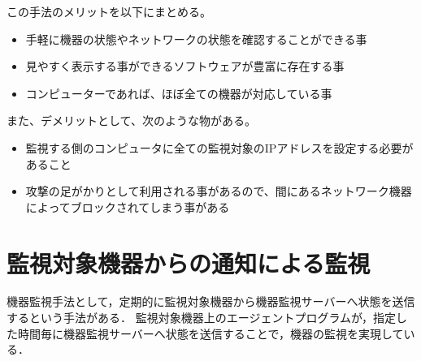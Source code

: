 	この手法のメリットを以下にまとめる。
	\begin{itemize}
		\item 手軽に機器の状態やネットワークの状態を確認することができる事
		\item 見やすく表示する事ができるソフトウェアが豊富に存在する事
		\item コンピューターであれば、ほぼ全ての機器が対応している事
	\end{itemize}

	また、デメリットとして、次のような物がある。
	\begin{itemize}
		\item 監視する側のコンピュータに全ての監視対象のIPアドレスを設定する必要があること
		\item 攻撃の足がかりとして利用される事があるので、間にあるネットワーク機器によってブロックされてしまう事がある
	\end{itemize}

\begin{comment}
	IoT機器の監視は、機器がNAPTの内側にある場合が多く、ユーザーに近い場所に設置されることが多いので、この方法を用いるためには、
	機器がグローバルIPアドレスを持っていること、間のネットワークにて監視用パケットがブロックされない様ネットワーク機器を設定すること、
	が必要である。

	この形では，機器監視サーバは，監視対象機器のIPアドレスを覚えておかねばならない．
	そのため，監視対象が接続されるネットワークが切り替わった場合，監視サーバ上に記録されたIPアドレスを変更しなくては監視できない．
	監視対象が，多量且つ移動するIoT機器の監視において，頻繁に監視サーバ上に記録されたIPアドレスを書き換えるのは大変である．
	また，プライベートアドレスの利用時には，サーバーからIoT機器への到達性が失われる可能性がある．
\end{comment}

\section{監視対象機器からの通知による監視}
	機器監視手法として，定期的に監視対象機器から機器監視サーバーへ状態を送信するという手法がある．
	監視対象機器上のエージェントプログラムが，指定した時間毎に機器監視サーバーへ状態を送信することで，機器の監視を実現している．
	\medskip
	
